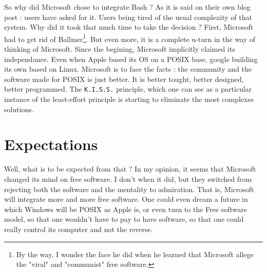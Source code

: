 \documentclass{article}
\begin{document}
So why did Microsoft chose to integrate Bash ? As it is said on their own blog post : users have asked for it. Users being tired of the usual complexity of that system. Why did it took that much time to take the decision ? First, Microsoft had to get rid of Ballmer\footnote{By the way, I wonder the face he did when he learned that Microsoft allege the "viral" and "communist" free software.}. But even more, it is a complete u-turn in the way of thinking of Microsoft. Since the begining, Microsoft implicitly claimed its independance. Even when Apple based its OS on a POSIX base, google building its own based on Linux. Microsoft is to face the facts : the community and the software made for POSIX is just better. It is better tought, better designed, better programmed. The \texttt{K.I.S.S.} principle, which one can see as a particular instance of the least-effort principle is starting to eliminate the most complexes solutions.

\section{Expectations}
Well, what is to be expected from that ? In my opinion, it seems that Microsoft changed its mind on free software. I don't when it did, but they switched from rejecting both the software and the mentality to admiration. That is, Microsoft will integrate more and more free software. One could even dream a future in which Windows will be POSIX as Apple is, or even turn to the Free software model, so that one wouldn't have to pay to have software, so that one could really control its computer and not the reverse.
\end{document}
